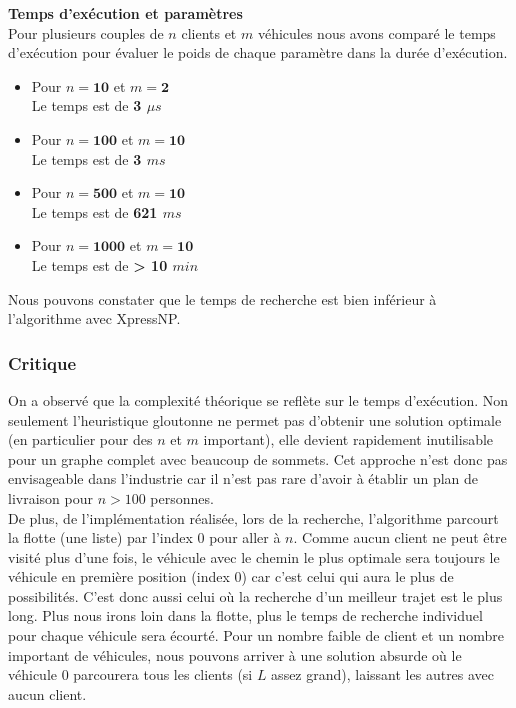 \documentclass[a4paper, 12pt, DIV=12]{scrartcl}
\begin{document}
\textbf{Temps d'exécution et paramètres} \\[5pt]
Pour plusieurs couples de $n$ clients et $m$ véhicules nous avons comparé le temps d'exécution pour évaluer le poids de chaque paramètre dans la durée d'exécution. 
\begin{itemize}
    \item Pour $n = \textbf{10}$ et $m = \textbf{2}$ \\
            Le temps est de \textbf{3 $\mu s$}
    \item Pour $n = \textbf{100}$ et $m = \textbf{10}$ \\
            Le temps est de \textbf{3 $ms$}
    \item Pour $n = \textbf{500}$ et $m = \textbf{10}$ \\
            Le temps est de \textbf{621 $ms$}
     \item Pour $n = \textbf{1000}$ et $m = \textbf{10}$ \\
            Le temps est de \textbf{> 10 $min$} \\[10pt]
\end{itemize} 

Nous pouvons constater que le temps de recherche est bien inférieur à l'algorithme avec XpressNP.
\subsubsection{Critique}
On a observé que la complexité théorique se reflète sur le temps d'exécution. Non seulement l'heuristique gloutonne ne permet pas d'obtenir une solution optimale (en particulier pour des $n$ et $m$ important), elle devient rapidement inutilisable pour un graphe complet avec beaucoup de sommets. Cet approche n'est donc pas envisageable dans l'industrie car il n'est pas rare d'avoir à établir un plan de livraison pour $n >100$ personnes. \\[5pt]
De plus, de l'implémentation réalisée, lors de la recherche, l'algorithme parcourt la flotte (une liste) par l'index 0 pour aller à $n$. Comme aucun client ne peut être visité plus d'une fois, le véhicule avec le chemin le plus optimale sera toujours le véhicule en première position (index 0) car c'est celui qui aura le plus de possibilités. C'est donc aussi celui où la recherche d'un meilleur trajet est le plus long. Plus nous irons loin dans la flotte, plus le temps de recherche individuel pour chaque véhicule sera écourté. Pour un nombre faible de client et un nombre important de véhicules, nous pouvons arriver à une solution absurde où le véhicule 0 parcourera tous les clients (si $L$ assez grand), laissant les autres avec aucun client. 
\newpage
\end{document}

